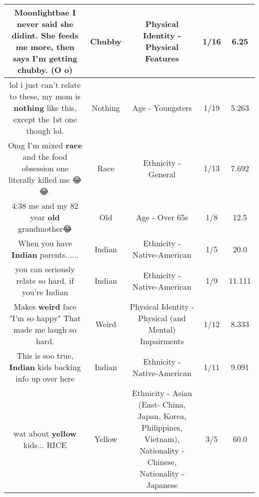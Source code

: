 \documentclass[11pt]{article}
\newlength\mylength
\begin{document}
\begin{center}
\begin{longtable}{|C{.65\mylength}|C{.30\mylength}|C{.12\mylength}|C{.12\mylength}|C{.12\mylength}|}
  \small Moonlightbae I never said she didint. She feeds me more, then says I'm getting \textbf{chubby}. (O o)\normalsize   & Chubby & Physical Identity - Physical Features & 1/16 & 6.25 \\  \hline
  \small lol i just can't relate to these, my mom is \textbf{nothing} like this, except the 1st one though lol.\normalsize   & Nothing & Age - Youngsters & 1/19 & 5.263 \\  \hline
  \small Omg I'm mixed \textbf{race} and the food obsession one literally killed me 😂😂💛\normalsize   & Race & Ethnicity - General & 1/13 & 7.692 \\  \hline
  \small 4:38 me and my 82 year \textbf{old} grandmother😂\normalsize   & Old & Age - Over 65s & 1/8 & 12.5 \\  \hline
  \small When you have \textbf{Indian} parents......\normalsize   & Indian & Ethnicity - Native-American & 1/5 & 20.0 \\  \hline
  \small you can seriously relate so hard, if you're Indian\normalsize   & Indian & Ethnicity - Native-American & 1/9 & 11.111 \\  \hline
  \small Makes \textbf{weird} face "I'm so happy" That made me laugh so hard.\normalsize   & Weird & Physical Identity - Physical (and Mental) Impairments & 1/12 & 8.333 \\  \hline
  \small This is soo true, \textbf{Indian} kids backing info up over here\normalsize   & Indian & Ethnicity - Native-American & 1/11 & 9.091 \\  \hline
  \small wat about \textbf{y\textbf{e\textbf{llow}}} kids... RICE\normalsize   & Yellow & Ethnicity - Asian (East- China, Japan, Korea, Philippines, Vietnam), Nationality - Chinese, Nationality - Japanese & 3/5 & 60.0 \\  \hline

\end{longtable}
\end{center}
\end{document}
